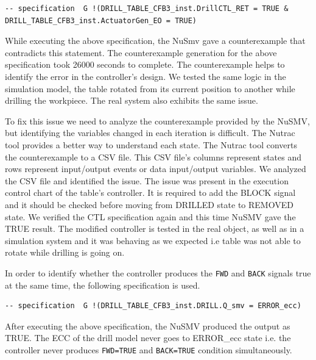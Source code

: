 \begin{bibunit}
\begin{lstlisting}[breaklines,basicstyle=\small]
-- specification  G !(DRILL_TABLE_CFB3_inst.DrillCTL_RET = TRUE & DRILL_TABLE_CFB3_inst.ActuatorGen_EO = TRUE)  
\end{lstlisting}

While executing the above specification, the NuSmv gave a counterexample that contradicts this statement. The counterexample generation for the above specification took 26000 seconds to complete. The counterexample helps to identify the error in the controller's design. We tested the same logic in the simulation model, the table rotated from its current position to another while drilling the workpiece. The real system also exhibits the same issue.

To fix this issue we need to analyze the counterexample provided by the NuSMV, but identifying the variables changed in each iteration is difficult. The Nutrac tool provides a better way to understand each state. The Nutrac tool converts the counterexample to a CSV file. This CSV file's columns represent states and rows represent input/output events or data input/output variables. We analyzed the CSV file and identified the issue. The issue was present in the execution control chart of the table's controller. It is required to add the BLOCK signal and it should be checked before moving from DRILLED state to REMOVED state. We verified the CTL specification again and this time NuSMV gave the TRUE result. The modified controller is tested in the real object, as well as in a simulation system and it was behaving as we expected i.e table was not able to rotate while drilling is going on.

In order to identify whether the controller produces the \texttt{FWD} and \texttt{BACK} signals true at the same time, the following specification is used.

\begin{lstlisting}[breaklines,basicstyle=\small]
-- specification  G !(DRILL_TABLE_CFB3_inst.DRILL.Q_smv = ERROR_ecc)
\end{lstlisting}

After executing the above specification, the NuSMV produced the output as TRUE. The ECC of the drill model never goes to ERROR\_ecc state i.e. the controller never produces \texttt{FWD=TRUE} and \texttt{BACK=TRUE} condition simultaneously.  


\end{bibunit}
